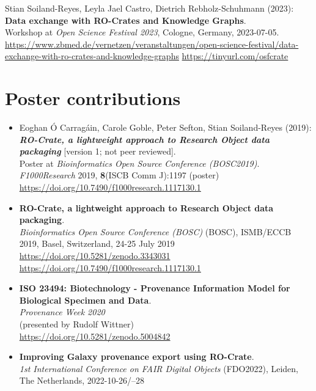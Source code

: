 Stian Soiland-Reyes, Leyla Jael Castro, Dietrich Rebholz-Schuhmann (2023):\\
\textbf{Data exchange with RO-Crates and Knowledge Graphs}.\\
Workshop at \emph{Open Science Festival 2023}, Cologne, Germany, 2023-07-05.\\
\url{https://www.zbmed.de/vernetzen/veranstaltungen/open-science-festival/data-exchange-with-ro-crates-and-knowledge-graphs} 
\url{https://tinyurl.com/osfcrate}


\section{Poster contributions}


\begin{itemize}
  \item
    Eoghan Ó Carragáin, Carole Goble, Peter Sefton, Stian Soiland-Reyes
    (2019):\\
    \textbf{\emph{RO-Crate, a lightweight approach to Research Object data
    packaging}} {[}version 1; not peer reviewed{]}.\\
    Poster at \emph{Bioinformatics Open Source Conference (BOSC2019)}.
    \emph{F1000Research} 2019, \textbf{8}(ISCB Comm J):1197 (poster)\\
    \url{https://doi.org/10.7490/f1000research.1117130.1}
  \item
    \textbf{RO-Crate, a lightweight approach to Research Object data
    packaging}.\\
    \emph{Bioinformatics Open Source Conference (BOSC)} (BOSC), ISMB/ECCB
    2019, Basel, Switzerland, 24-25 July 2019\\
    \url{https://doi.org/10.5281/zenodo.3343031}~\\
    \url{https://doi.org/10.7490/f1000research.1117130.1}
  \item
    \textbf{ISO 23494: Biotechnology - Provenance Information Model for
    Biological Specimen and Data}.\\
    \emph{Provenance Week 2020}\\
    (presented by Rudolf Wittner)\\
    \url{https://doi.org/10.5281/zenodo.5004842}
  \item
    \textbf{Improving Galaxy provenance export using RO-Crate}.\\
    \emph{1st International Conference on FAIR Digital Objects} (FDO2022),
    Leiden, The Netherlands, 2022-10-26/--28\\

\end{itemize}
